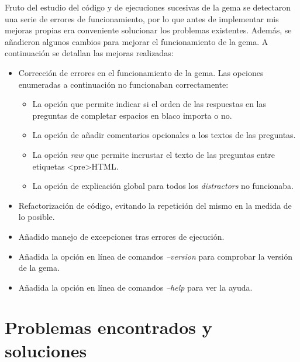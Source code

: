 

Fruto del estudio del c\'odigo y de ejecuciones sucesivas de la gema se detectaron una serie de errores de funcionamiento,
por lo que antes de implementar mis mejoras propias era conveniente solucionar los problemas existentes.
Adem\'as, se a\~{n}adieron algunos cambios para mejorar el funcionamiento de la gema. A continuaci\'on se detallan las mejoras
realizadas:

\begin{itemize}
  \item Correcci\'on de errores en el funcionamiento de la gema. Las opciones enumeradas a continuaci\'on no funcionaban correctamente:
  \begin{itemize}
    \item La opci\'on que permite indicar si el orden de las respuestas en las preguntas de completar espacios en blaco importa o no.
    \item La opci\'on de a\~{n}adir comentarios opcionales a los textos de las preguntas.
    \item La opci\'on \textit{raw} que permite incrustar el texto de las preguntas entre etiquetas \textless pre\textgreater \space HTML.
    \item La opci\'on de explicaci\'on global para todos los \textit{distractors} no funcionaba.
  \end{itemize}
  \item Refactorizaci\'on de c\'odigo, evitando la repetici\'on del mismo en la medida de lo posible.
  \item A\~{n}adido manejo de excepciones tras errores de ejecuci\'on.
  \item A\~{n}adida la opci\'on en l\'inea de comandos \textit{--version} para comprobar la versi\'on de la gema. 
  \item A\~{n}adida la opci\'on en l\'inea de comandos \textit{--help} para ver la ayuda. 
\end{itemize}
\bigskip

\section{Problemas encontrados y soluciones}
\label{3:sec:1}

